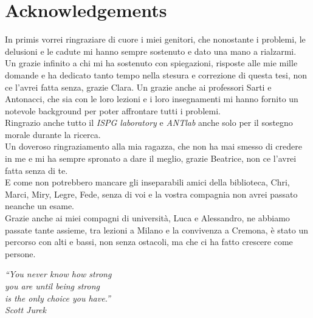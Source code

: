 \chapter{Acknowledgements}
\label{Acknowledgements}
\thispagestyle{empty}

\vspace{0.5cm}
In primis vorrei ringraziare di cuore i miei genitori, che nonostante i problemi, le delusioni e le cadute mi hanno sempre sostenuto e dato una mano a rialzarmi.
\\
Un grazie infinito a chi mi ha sostenuto con spiegazioni, risposte alle mie mille domande e ha dedicato tanto tempo nella stesura e correzione di questa tesi, non ce l'avrei fatta senza, grazie Clara. Un grazie anche ai professori Sarti e Antonacci, che sia con le loro lezioni e i loro insegnamenti mi hanno fornito un notevole background per poter affrontare tutti i problemi.
\\
Ringrazio anche tutto il \textit{ISPG laboratory} e \textit{ANTlab} anche solo per il sostegno morale durante la ricerca.
\\
Un doveroso ringraziamento alla mia ragazza, che non ha mai smesso di credere in me e mi ha sempre spronato a dare il meglio, grazie Beatrice, non ce l'avrei fatta senza di te.
\\
E come non potrebbero mancare gli inseparabili amici della biblioteca, Chri, Marci, Miry, Legre, Fede, senza di voi e la vostra compagnia non avrei passato neanche un esame.
\\
Grazie anche ai miei compagni di università, Luca e Alessandro, ne abbiamo passate tante assieme, tra lezioni a Milano e la convivenza a Cremona, è stato un percorso con alti e bassi, non senza ostacoli, ma che ci ha fatto crescere come persone.

\vspace{1cm}
\begin{flushright}
\textit{“You never know how strong \\ you are until being strong \\ is the only choice you have.” \\ Scott Jurek}
\end{flushright}